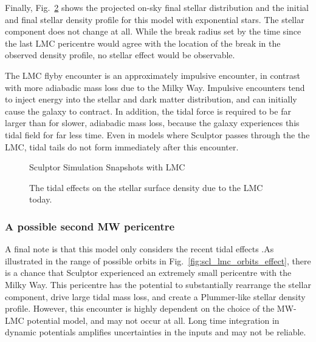 Finally, Fig.~\ref{fig:scl_lmc_i_f} shows the projected on-sky final
stellar distribution and the initial and final stellar density profile
for this model with exponential stars. The stellar component does not
change at all. While the break radius set by the time since the last LMC
pericentre would agree with the location of the break in the observed
density profile, no stellar effect would be observable.

The LMC flyby encounter is an approximately impulsive encounter, in
contrast with more adiabadic mass loss due to the Milky Way. Impulsive
encounters tend to inject energy into the stellar and dark matter
distribution, and can initially cause the galaxy to contract. In
addition, the tidal force is required to be far larger than for slower,
adiabadic mass loss, because the galaxy experiences this tidal field for
far less time. Even in models where Sculptor passes through the the LMC,
tidal tails do not form immediately after this encounter.

\begin{figure}
\centering
{}
\caption{Sculptor Simulation Snapshots with
LMC}\label{fig:scl_lmc_sim_images}
\end{figure}

\begin{figure}
\centering
{}
\caption[Sculptor initial and final density with LMC]{The tidal effects
on the stellar surface density due to the LMC
today.}\label{fig:scl_lmc_i_f}
\end{figure}

\subsubsection{A possible second MW
pericentre}\label{a-possible-second-mw-pericentre}

A final note is that this model only considers the recent tidal effects
.As illustrated in the range of possible orbits in
Fig.~\ref{fig:scl_lmc_orbits_effect}, there is a chance that Sculptor
experienced an extremely small pericentre with the Milky Way. This
pericentre has the potential to substantially rearrange the stellar
component, drive large tidal mass loss, and create a Plummer-like
stellar density profile. However, this encounter is highly dependent on
the choice of the MW-LMC potential model, and may not occur at all. Long
time integration in dynamic potentials amplifies uncertainties in the
inputs and may not be reliable.

